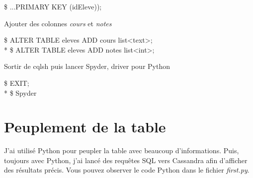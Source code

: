 \documentclass{article}
\begin{document}
\begin{enumerate}
\begin{item}
\begin{tcolorbox}
\$ ...PRIMARY KEY (idEleve));
\end{tcolorbox}
\end{item}
\begin{item}
Ajouter des colonnes \textit{cours} et \textit{notes}
\begin{tcolorbox}
\$ ALTER TABLE eleves ADD cours list\textless text\textgreater ; \\*
\$ ALTER TABLE eleves ADD notes list\textless int\textgreater ;
\end{tcolorbox}
\end{item}
\begin{item}
Sortir de cqlsh puis lancer Spyder, driver pour Python
\begin{tcolorbox}
\$ EXIT; \\*
\$ Spyder
\end{tcolorbox}
\end{item}
\end{enumerate}


\section{Peuplement de la table}

J'ai utilis\'{e} Python pour peupler la table avec beaucoup d'informations. Puis, toujours avec Python, j'ai lanc\'{e} des requ\^{e}tes SQL vers Cassandra afin d'afficher des r\'{e}sultats pr\'{e}cis. Vous pouvez observer le code Python dans le fichier \textit{first.py}.
\end{document}

